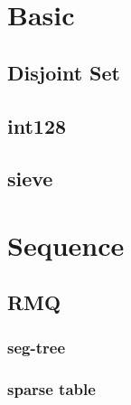 \section{Basic}

\subsection{Disjoint Set}


\subsection{int128}


\subsection{sieve}


\section{Sequence}

\subsection{RMQ}

\subsubsection{seg-tree}


\subsubsection{sparse table}
